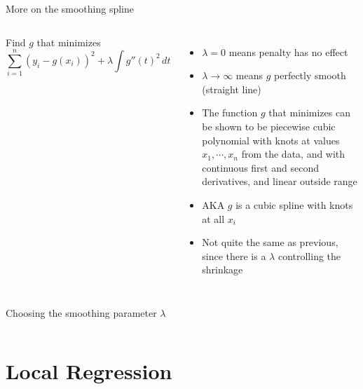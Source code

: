 \documentclass[aspectratio=169,usenames,dvipsnames]{beamer}
\newcommand{\InstructorList}[1]{
\begin{itemize}
	\color{orange}
	#1
\end{itemize}
}
\begin{document}
\begin{frame}[t]{More on the smoothing spline }

\begin{columns}
\centering
Find $g$ that minimizes
\begin{equation*}
	\sum_{i=1}^n (y_i-g(x_i))^2 + \lambda \int g''(t)^2 \,dt
\end{equation*}

\centering

\InstructorList{
  \item $\lambda = 0$ means penalty has no effect
	\item $\lambda \to \infty$ means $g$ perfectly smooth (straight line)
	\item The function $g$ that minimizes can be shown to be piecewise cubic polynomial with knots at values $x_1,\cdots,x_n$ from the data, and with continuous first and second derivatives, and linear outside range
	\item AKA $g$ is a cubic spline with knots at all $x_i$
	\item Not quite the same as previous, since there is a $\lambda$ controlling the shrinkage
}

\end{columns}

\end{frame}

\begin{frame}[t]{Choosing the smoothing parameter $\lambda$}

\begin{columns}
\centering

\centering

\end{columns}

\end{frame}

\section{Local Regression}
\end{document}
